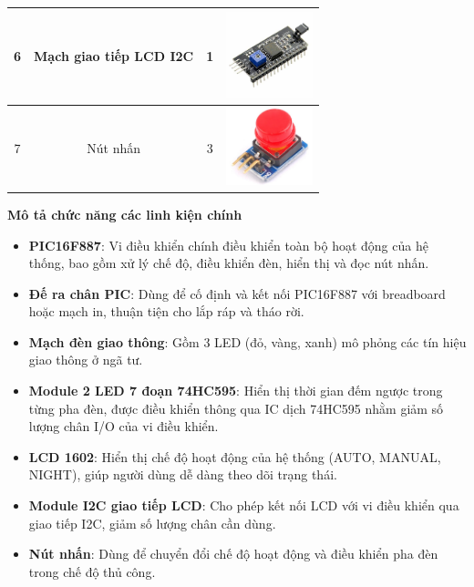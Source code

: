 \begin{center}
\begin{tabular}{|c|c|c|>{\centering\arraybackslash}m{3cm}|}
    \hline
    6 & Mạch giao tiếp LCD I2C & 1 & \includegraphics[width=2.5cm]{pictures/i2c.png} \\
    \hline
    7 & Nút nhấn & 3 & \includegraphics[width=2.5cm]{pictures/button.png} \\
    \hline
\end{tabular}
\end{center}
\cleardoublepage
\textbf{Mô tả chức năng các linh kiện chính}
\begin{itemize}
    \item \textbf{PIC16F887}: Vi điều khiển chính điều khiển toàn bộ hoạt động của hệ thống, bao gồm xử lý chế độ, điều khiển đèn, hiển thị và đọc nút nhấn.
    \item \textbf{Đế ra chân PIC}: Dùng để cố định và kết nối PIC16F887 với breadboard hoặc mạch in, thuận tiện cho lắp ráp và tháo rời.
    \item \textbf{Mạch đèn giao thông}: Gồm 3 LED (đỏ, vàng, xanh) mô phỏng các tín hiệu giao thông ở ngã tư.
    \item \textbf{Module 2 LED 7 đoạn 74HC595}: Hiển thị thời gian đếm ngược trong từng pha đèn, được điều khiển thông qua IC dịch 74HC595 nhằm giảm số lượng chân I/O của vi điều khiển.
    \item \textbf{LCD 1602}: Hiển thị chế độ hoạt động của hệ thống (AUTO, MANUAL, NIGHT), giúp người dùng dễ dàng theo dõi trạng thái.
    \item \textbf{Module I2C giao tiếp LCD}: Cho phép kết nối LCD với vi điều khiển qua giao tiếp I2C, giảm số lượng chân cần dùng.
    \item \textbf{Nút nhấn}: Dùng để chuyển đổi chế độ hoạt động và điều khiển pha đèn trong chế độ thủ công.
\end{itemize}
\cleardoublepage